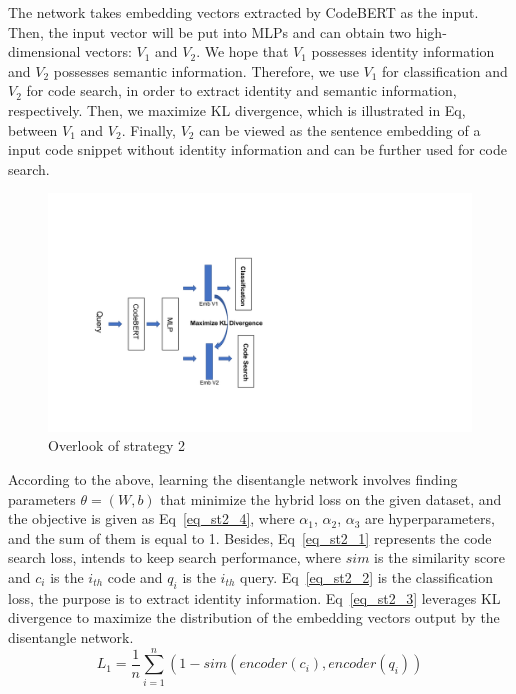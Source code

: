 The network takes embedding vectors extracted by CodeBERT as the input. 
Then, the input vector will be put into MLPs and can obtain 
two high-dimensional vectors: $V_1$ and $V_2$. 
We hope that $V_1$ possesses identity information and $V_2$  
possesses semantic information. Therefore, 
we use $V_1$ for classification and $V_2$ for code search, 
in order to extract identity and semantic information, respectively. 
Then, we maximize KL divergence, which is illustrated in Eq, between $V_1$ and $V_2$. 
Finally, $V_2$ can be viewed as the sentence embedding 
of a input code snippet without identity information and can be further 
used for code search.

\begin{figure}[htb]
	\centering
	\includegraphics[width=0.8\linewidth]{imgs/st2.pdf}
	\caption{Overlook of strategy 2}
	\label{fig:st2}
\end{figure}

According to the above, learning the disentangle network 
involves finding parameters $\theta=(W,b)$ that minimize the hybrid loss on the given dataset, 
and the objective is given as Eq~\ref{eq_st2_4}, 
where $\alpha_1$, $\alpha_2$, $\alpha_3$ are hyperparameters, 
and the sum of them is equal to 1. 
Besides, Eq~\ref{eq_st2_1} represents the code search loss, intends to keep search performance, 
where $sim$ is  the similarity score and $c_i$ is the $i_{th}$ code and $q_i$  is the $i_{th}$ query. 
Eq~\ref{eq_st2_2} is the classification loss, the purpose is to extract identity information. 
Eq~\ref{eq_st2_3} leverages KL divergence to maximize the distribution of the embedding vectors output 
by the disentangle network.
\begin{equation}\label{eq_st2_1}
L_{1} = \frac{1}{n}{\sum_{i = 1}^{n}\left( 1 - sim\left( encoder\left( c_{i} \right),encoder\left( q_{i} \right) \right) \right.}
\end{equation}

